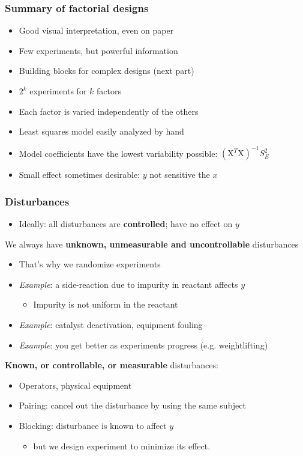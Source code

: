\begin{frame}\frametitle{Summary of factorial designs}
	\begin{itemize}
		\item	Good visual interpretation, even on paper
		\item	Few experiments, but powerful information
		\item	Building blocks for complex designs (next part)
		\item	$2^k$ experiments for $k$ factors
		\item	Each factor is varied independently of the others
		\item	Least squares model easily analyzed by hand
		\item	Model coefficients have the lowest variability possible: $(\mathrm{X}^T\mathrm{X})^{-1}S_E^2$
		\item	Small effect sometimes desirable: $y$ not sensitive the $x$
	\end{itemize}
\end{frame}

\begin{frame}\frametitle{Disturbances}
	\begin{itemize}
		\item	Ideally: all disturbances are \textbf{controlled}; have no effect on $y$
	\end{itemize}

	We always have \textbf{unknown, unmeasurable and uncontrollable} disturbances
	\begin{itemize}
		\item	That's why we randomize experiments
		\item	\emph{Example}: a side-reaction due to impurity in reactant affects $y$
		\begin{itemize}
			\item	Impurity is not uniform in the reactant
		\end{itemize}
		\item	\emph{Example}: catalyst deactivation, equipment fouling
		\item	\emph{Example}: you get better as experiments progress (e.g. weightlifting)
	\end{itemize}

	\textbf{Known, or controllable, or measurable} disturbances:
	\begin{itemize}
		\item	Operators, physical equipment
		\item	Pairing: cancel out the disturbance by using the same subject
		\item	Blocking: disturbance is known to affect $y$
		\begin{itemize}
			\item	but we design experiment to minimize its effect.
		\end{itemize}
	\end{itemize}
\end{frame}

